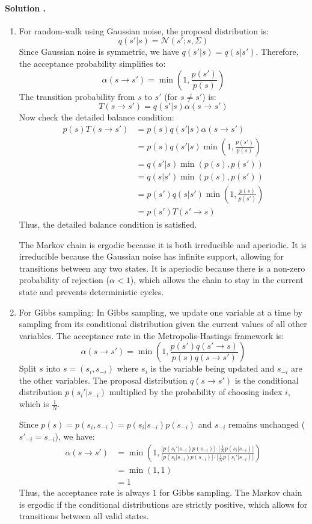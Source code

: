 \documentclass{article}
\newcounter{solutionCount}
\newcommand{\solution}[1]{
    \stepcounter{solutionCount}
    \paragraph{Solution \thesolutionCount.}
    {
        #1
    }
}
\begin{document}
\solution{
    \begin{enumerate}
        \item For random-walk using Gaussian noise, the proposal distribution is: 
        \[q(s'|s) = \mathcal{N}(s'; s, \Sigma)\]
        Since Gaussian noise is symmetric, we have $q(s'|s) = q(s|s')$. Therefore, the acceptance probability simplifies to:
        \[\alpha(s \to s') = \min\left(1, \frac{p(s')}{p(s)}\right)\]
        The transition probability from $s$ to $s'$ (for $s \neq s'$) is:
        \[T(s \to s') = q(s'|s) \alpha(s \to s')\]
        Now check the detailed balance condition:
        \begin{align*}
        p(s) T(s \to s') &= p(s) q(s'|s) \alpha(s \to s') \\
        &= p(s) q(s'|s) \min\left(1, \frac{p(s')}{p(s)}\right) \\
        &= q(s'|s) \min(p(s), p(s')) \\
        &= q(s|s') \min(p(s), p(s')) \\
        &= p(s') q(s|s') \min\left(1, \frac{p(s)}{p(s')}\right) \\  
        &= p(s') T(s' \to s)
        \end{align*}
        Thus, the detailed balance condition is satisfied.
        
        The Markov chain is ergodic because it is both irreducible and aperiodic. It is irreducible because the Gaussian noise has infinite support, allowing for transitions between any two states. It is aperiodic because there is a non-zero probability of rejection ($\alpha < 1$), which allows the chain to stay in the current state and prevents deterministic cycles.

        \item For Gibbs sampling:
        In Gibbs sampling, we update one variable at a time by sampling from its conditional distribution given the current values of all other variables. The acceptance rate in the Metropolis-Hastings framework is:
        \[\alpha(s \to s') = \min\left(1, \frac{p(s') q(s' \to s)}{p(s) q(s \to s')}\right)\]
        Split $s$ into $s = (s_i, s_{-i})$ where $s_i$ is the variable being updated and $s_{-i}$ are the other variables. The proposal distribution $q(s \to s')$ is the conditional distribution $p(s_i'|s_{-i})$ multiplied by the probability of choosing index $i$, which is $\frac{1}{N}$. 
        
        Since $p(s) = p(s_i, s_{-i}) = p(s_i|s_{-i})p(s_{-i})$ and $s_{-i}$ remains unchanged ($s'_{-i} = s_{-i}$), we have:
        \begin{align*}
        \alpha(s \to s') &= \min\left(1, \frac{\big[p(s_i'|s_{-i})p(s_{-i})\big] \cdot \big[\frac{1}{N}p(s_i|s_{-i})\big]}{\big[p(s_i|s_{-i})p(s_{-i})\big] \cdot \big[\frac{1}{N}p(s_i'|s_{-i})\big]}\right) \\
        &= \min(1, 1) \\
        &= 1
        \end{align*}
        Thus, the acceptance rate is always $1$ for Gibbs sampling. The Markov chain is ergodic if the conditional distributions are strictly positive, which allows for transitions between all valid states.


\end{enumerate}}
\end{document}
